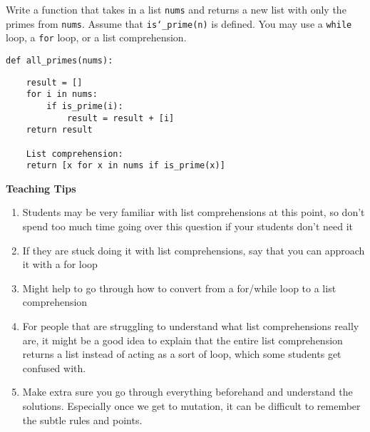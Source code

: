 \begin{blocksection}
\question Write a function that takes in a list \texttt{nums} and returns a
new list with only the primes from \texttt{nums}. Assume that
\texttt{is\char`_prime(n)} is defined. You may use a \texttt{while} loop, a
\texttt{for} loop, or a list comprehension.

\begin{lstlisting}
def all_primes(nums):
\end{lstlisting}
\begin{solution}[2in]
\begin{lstlisting}
    result = []
    for i in nums:
        if is_prime(i):
            result = result + [i]
    return result

    List comprehension:
    return [x for x in nums if is_prime(x)]
\end{lstlisting}
\end{solution}
\end{blocksection}

\begin{blocksection}
    \begin{guide}
    \textbf{Teaching Tips}
    \begin{enumerate}
            \item Students may be very familiar with list comprehensions at this point, so don’t spend too much time going over this question if your students don’t need it
            \item  If they are stuck doing it with list comprehensions, say that you can approach it with a for loop
            \item Might help to go through how to convert from a for/while loop to a list comprehension
            \item For people that are struggling to understand what list comprehensions really are, it might be a good idea to explain that the entire list comprehension returns a list instead of acting as a sort of loop, which some students get confused with.
            \item Make extra sure you go through everything beforehand and understand the solutions. Especially once we get to mutation, it can be difficult to remember the subtle rules and points.
    \end{enumerate}
    \end{guide}
\end{blocksection}